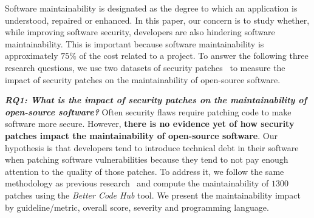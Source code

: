 \documentclass[smallextended]{svjour3}       %
\begin{document}
Software maintainability is designated as the degree to which an 
application is understood, repaired or enhanced. In this paper, our 
concern is to study whether, while improving software security, 
developers are also hindering software maintainability. This is 
important because software 
maintainability is approximately $75\%$ of the cost related to a 
project. To answer the following three research questions, we use 
two datasets of security 
patches~\cite{Reis:2017:IJSSE,10.1109/MSR.2019.00064} to measure the 
impact of security patches on the maintainability of open-source 
software. 
%

\textit{\textbf{RQ1: What is the impact of security patches on the
maintainability of open-source software?}} Often security flaws 
require patching code to make software more secure. However, 
\textbf{there is no evidence yet of how security patches impact the
maintainability of open-source software}. Our hypothesis is that 
developers tend to introduce technical debt in their software when 
patching software vulnerabilities because they tend to not pay enough 
attention to the quality of those patches. To address it, 
we follow the same methodology as previous research~\cite{8919169} and compute 
the maintainability of $1300$ patches using the \emph{Better Code Hub} tool. 
We present the maintainability impact by guideline/metric, overall score, 
severity and programming language.
\end{document}
